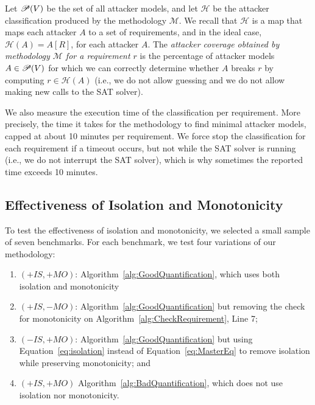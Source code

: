 {\begin{definition}[Coverage]
Let ${{\mathscr{P}}\!\left({V}\right)}$ be the set of all attacker models, and let $\mathcal{H}$ be the attacker classification produced by the methodology $\mathcal{M}$. We recall that $\mathcal{H}$ is a map that maps each attacker $A$ to a set of requirements, and in the ideal case, $\mathcal{H}(A)=A[R]$, for each attacker $A$. The \emph{attacker coverage obtained by methodology $\mathcal{M}$ for a requirement $r$} is the percentage of attacker models $A\in{{\mathscr{P}}\!\left({V}\right)}$ for which we can correctly determine whether $A$ breaks $r$ by computing $r\in \mathcal{H}(A)$ (i.e., we do not allow guessing and we do not allow making new calls to the SAT solver).
\end{definition}

We also measure the execution time of the classification per requirement. More precisely, the time it takes for the methodology to find minimal attacker models, capped at about 10 minutes per requirement. We force stop the classification for each requirement if a timeout occurs, but not while the SAT solver is running (i.e., we do not interrupt the SAT solver), which is why sometimes the reported time exceeds 10 minutes.

\subsection{Effectiveness of Isolation and Monotonicity}
To test the effectiveness of isolation and monotonicity, we selected a small sample of seven benchmarks. For each benchmark, we test four variations of our methodology: 
\begin{enumerate}
\item{$(+IS, +MO)$}: Algorithm~\ref{alg:GoodQuantification}, which uses both isolation and monotonicity
\item{$(+IS,-MO)$}: Algorithm~\ref{alg:GoodQuantification} but removing the check for monotonicity on Algorithm~\ref{alg:CheckRequirement}, Line 7;
\item{$(-IS,+MO)$}: Algorithm~\ref{alg:GoodQuantification} but using Equation~\ref{eq:isolation} instead of Equation~\ref{eq:MasterEq} to remove isolation while preserving monotonicity; and 
\item{$(+IS,+MO)$} Algorithm~\ref{alg:BadQuantification}, which does not use isolation nor monotonicity. 
\end{enumerate}

}
